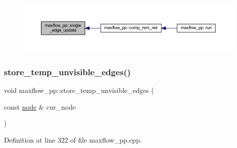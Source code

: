 \begin{figure}[H]
\begin{center}
\leavevmode
\includegraphics[width=350pt]{classmaxflow__pp_a3e59652a416d1553f8a1d1229dd2cd38_icgraph}
\end{center}
\end{figure}
\mbox{\label{classmaxflow__pp_abb23812a3e8bca1955b835d3c41836e1}} 
\subsubsection{\texorpdfstring{store\+\_\+temp\+\_\+unvisible\+\_\+edges()}{store\_temp\_unvisible\_edges()}}
{\footnotesize\ttfamily void maxflow\+\_\+pp\+::store\+\_\+temp\+\_\+unvisible\+\_\+edges (\begin{DoxyParamCaption}\item[{const \mbox{\hyperlink{classnode}{node}} \&}]{cur\+\_\+node }\end{DoxyParamCaption})\hspace{0.3cm}{\ttfamily [protected]}}



Definition at line 322 of file maxflow\+\_\+pp.\+cpp.


